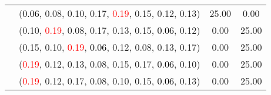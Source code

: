 \documentclass[10pt,a4paper]{report}
\begin{document}
\begin{center}
\begin{longtable}{clcc}
			&(\textcolor{black}{0.06}, 0.08, 0.10, 0.17, \textcolor{red}{0.19}, 0.15, 0.12, 0.13)&25.00&0.00\\
			&(0.10, \textcolor{red}{0.19}, 0.08, 0.17, 0.13, 0.15, \textcolor{black}{0.06}, 0.12)&0.00&25.00\\
			&(0.15, 0.10, \textcolor{red}{0.19}, \textcolor{black}{0.06}, 0.12, 0.08, 0.13, 0.17)&0.00&25.00\\
			&(\textcolor{red}{0.19}, 0.12, 0.13, 0.08, 0.15, 0.17, \textcolor{black}{0.06}, 0.10)&0.00&25.00\\
			&(\textcolor{red}{0.19}, 0.12, 0.17, 0.08, 0.10, 0.15, \textcolor{black}{0.06}, 0.13)&0.00&25.00\\
		\bottomrule
	\end{longtable}
\end{center}
\newpage
\end{document}
